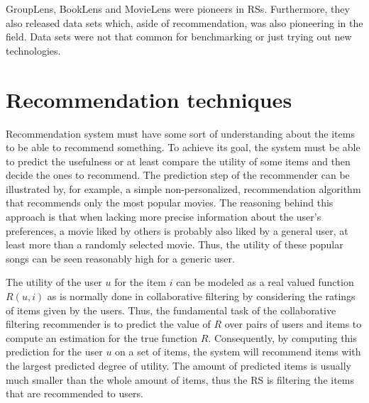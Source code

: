 \documentclass[main.tex]{thesis.tex}
\begin{document}
GroupLens, BookLens and MovieLens were pioneers in RSs.
Furthermore, they also released data sets which, aside of recommendation, was also pioneering in the field. Data sets were not that common for benchmarking or just trying out new technologies. \cite{aggarwal16}


\section{Recommendation techniques}

Recommendation system must have some sort of understanding about the items to be able to recommend something.
To achieve its goal, the system must be able to predict the usefulness or at least compare the utility of some items and then decide the ones to recommend.
The prediction step of the recommender can be illustrated by, for example, a simple non-personalized, recommendation algorithm that recommends only the most popular movies.
The reasoning behind this approach is that when lacking more precise information about the user's preferences, a movie liked by others is probably also liked by a general user, at least more than a randomly selected movie.
Thus, the utility of these popular songs can be seen reasonably high for a generic user. \cite{ricci11}

The utility of the user $u$ for the item $i$ can be modeled as a real valued function $R(u,i)$ as is normally done in collaborative filtering by considering the ratings of items given by the users.
Thus, the fundamental task of the collaborative filtering recommender is to predict the value of $R$ over pairs of users and items to compute an estimation for the true function $R$.
Consequently, by computing this prediction for the user $u$ on a set of items, the system will recommend items with the largest predicted degree of utility.
The amount of predicted items is usually much smaller than the whole amount of items, thus the RS is filtering the items that are recommended to users. \cite{ricci11}
\end{document}
